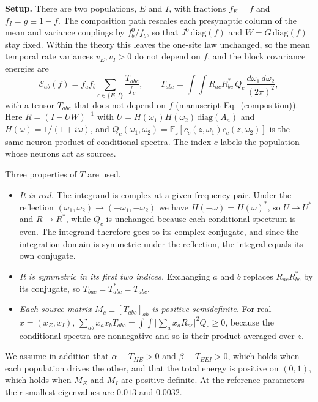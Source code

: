 \documentclass[11pt]{article}
\newcommand{\energy}{\mathcal E}
\begin{document}
\textbf{Setup.} There are two populations, $E$ and $I$, with fractions $f_E=f$ and $f_I=g\equiv1-f$. The composition path rescales each presynaptic column of the mean and variance couplings by $f_b^0/f_b$, so that $J^0\,\mathrm{diag}(f)$ and $W=G\,\mathrm{diag}(f)$ stay fixed. Within the theory this leaves the one-site law unchanged, so the mean temporal rate variances $v_E,v_I>0$ do not depend on $f$, and the block covariance energies are
\begin{equation}
 \energy_{ab}(f)=f_af_b\sum_{c\in\{E,I\}}\frac{T_{abc}}{f_c},
 \qquad
 T_{abc}=\int\!\!\int R_{ac}R_{bc}^{*}\,Q_c\,\frac{d\omega_1\,d\omega_2}{(2\pi)^2},
 \label{eq:blocks}
\end{equation}
with a tensor $T_{abc}$ that does not depend on $f$ (manuscript Eq.~(composition)). Here $R=(I-UW)^{-1}$ with $U=H(\omega_1)H(\omega_2)\,\mathrm{diag}(A_a)$ and $H(\omega)=1/(1+i\omega)$, and $Q_c(\omega_1,\omega_2)=\mathbb E_z[c_c(z,\omega_1)c_c(z,\omega_2)]$ is the same-neuron product of conditional spectra. The index $c$ labels the population whose neurons act as sources.

Three properties of $T$ are used.
\begin{itemize}
 \item \emph{It is real.} The integrand is complex at a given frequency pair. Under the reflection $(\omega_1,\omega_2)\to(-\omega_1,-\omega_2)$ we have $H(-\omega)=H(\omega)^*$, so $U\to U^*$ and $R\to R^*$, while $Q_c$ is unchanged because each conditional spectrum is even. The integrand therefore goes to its complex conjugate, and since the integration domain is symmetric under the reflection, the integral equals its own conjugate.
 \item \emph{It is symmetric in its first two indices.} Exchanging $a$ and $b$ replaces $R_{ac}R_{bc}^*$ by its conjugate, so $T_{bac}=T_{abc}^*=T_{abc}$.
 \item \emph{Each source matrix $M_c\equiv[T_{abc}]_{ab}$ is positive semidefinite.} For real $x=(x_E,x_I)$, $\sum_{ab}x_ax_bT_{abc}=\int\!\!\int\bigl|\sum_ax_aR_{ac}\bigr|^2Q_c\ge0$, because the conditional spectra are nonnegative and so is their product averaged over $z$.
\end{itemize}
We assume in addition that $\alpha\equiv T_{IIE}>0$ and $\beta\equiv T_{EEI}>0$, which holds when each population drives the other, and that the total energy is positive on $(0,1)$, which holds when $M_E$ and $M_I$ are positive definite. At the reference parameters their smallest eigenvalues are $0.013$ and $0.0032$.
\end{document}

